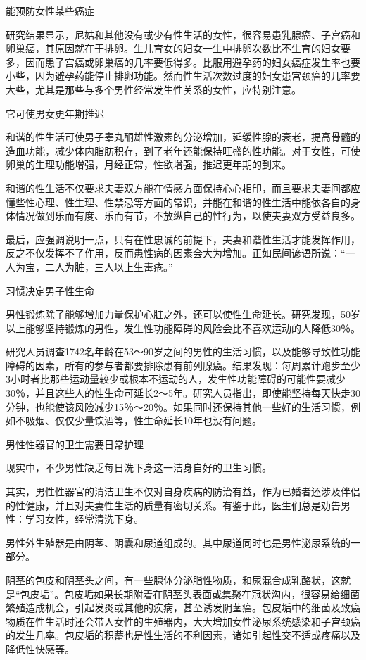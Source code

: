 \documentclass[12pt,UTF8]{ctexbook}
\begin{document}
能预防女性某些癌症

研究结果显示，尼姑和其他没有或少有性生活的女性，很容易患乳腺癌、子宫癌和卵巢癌，其原因就在于排卵。生儿育女的妇女一生中排卵次数比不生育的妇女要多，因而患子宫癌或卵巢癌的几率要低得多。比服用避孕药的妇女癌症发生率也要小些，因为避孕药能停止排卵功能。然而性生活次数过度的妇女患宫颈癌的几率要大些，尤其是那些与多个男性经常发生性关系的女性，应特别注意。

它可使男女更年期推迟

和谐的性生活可使男子睾丸酮雄性激素的分泌增加，延缓性腺的衰老，提高骨髓的造血功能，减少体内脂肪积存，到了老年还能保持旺盛的性功能。对于女性，可使卵巢的生理功能增强，月经正常，性欲增强，推迟更年期的到来。

和谐的性生活不仅要求夫妻双方能在情感方面保持心心相印，而且要求夫妻间都应懂些性心理、性生理、性禁忌等方面的常识，并能在和谐的性生活中能依各自的身体情况做到乐而有度、乐而有节，不放纵自己的性行为，以使夫妻双方受益良多。

最后，应强调说明一点，只有在性忠诚的前提下，夫妻和谐性生活才能发挥作用，反之不仅发挥不了作用，反而患性病的因素会大为增加。正如民间谚语所说：“一人为宝，二人为脏，三人以上生毒疮。”





习惯决定男子性生命


男性锻炼除了能够增加力量保护心脏之外，还可以使性生命延长。研究发现，50岁以上能够坚持锻炼的男性，发生性功能障碍的风险会比不喜欢运动的人降低30％。

研究人员调查1742名年龄在53～90岁之间的男性的生活习惯，以及能够导致性功能障碍的因素，所有的参与者都要排除患有前列腺癌。结果发现：每周累计跑步至少3小时者比那些运动量较少或根本不运动的人，发生性功能障碍的可能性要减少30％，并且这些人的性生命可延长2～5年。研究人员指出，即使能坚持每天快走30分钟，也能使该风险减少15％～20％。如果同时还保持其他一些好的生活习惯，例如不吸烟、仅仅少量饮酒等，性生命延长10年也没有问题。





男性性器官的卫生需要日常护理


现实中，不少男性缺乏每日洗下身这一洁身自好的卫生习惯。

其实，男性性器官的清洁卫生不仅对自身疾病的防治有益，作为已婚者还涉及伴侣的性健康，并且对夫妻性生活的质量有密切关系。有鉴于此，医生们总是劝告男性：学习女性，经常清洗下身。

男性外生殖器是由阴茎、阴囊和尿道组成的。其中尿道同时也是男性泌尿系统的一部分。

阴茎的包皮和阴茎头之间，有一些腺体分泌脂性物质，和尿混合成乳酪状，这就是“包皮垢”。包皮垢如果长期附着在阴茎头表面或集聚在冠状沟内，很容易给细菌繁殖造成机会，引起发炎或其他的疾病，甚至诱发阴茎癌。包皮垢中的细菌及致癌物质在性生活时还会带人女性的生殖器内，大大增加女性泌尿系统感染和子宫颈癌的发生几率。包皮垢的积蓄也是性生活的不利因素，诸如引起性交不适或疼痛以及降低性快感等。
\end{document}

